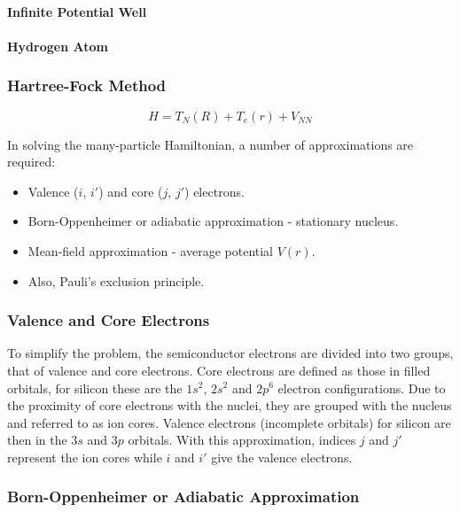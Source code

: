 \paragraph{Infinite Potential Well}
\paragraph{Hydrogen Atom}
\subsubsection{Hartree-Fock Method}
\begin{equation}
    H = T_{N}\left(R\right) + T_{e}\left(r\right) + V_{NN}
\end{equation}

In solving the many-particle Hamiltonian, a number of approximations are required:

\begin{itemize}
    \item Valence ($i$, $i\prime$) and core ($j$, $j\prime$) electrons.
    \item Born-Oppenheimer or adiabatic approximation - stationary nucleus.
    \item Mean-field approximation - average potential $V\left(r\right)$.
    \item Also, Pauli's exclusion principle. 
\end{itemize}

\subsubsection{Valence and Core Electrons}

To simplify the problem, the semiconductor electrons are divided into two groups, that of valence and core electrons. Core electrons are defined as those in filled orbitals, for silicon these are the $1s^{2}$, $2s^{2}$ and $2p^{6}$ electron configurations. Due to the proximity of core electrons with the nuclei, they are grouped with the nucleus and referred to as ion cores. Valence electrons (incomplete orbitals) for silicon are then in the $3s$ and $3p$ orbitals. With this approximation, indices $j$ and $j\prime$ represent the ion cores while $i$ and $i\prime$ give the valence electrons.

\subsubsection{Born-Oppenheimer or Adiabatic Approximation}


